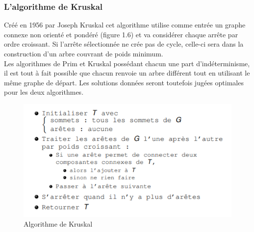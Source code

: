 \documentclass[memoire.tex]{subfiles}
\begin{document}
\subsubsection{L’algorithme de Kruskal}
Créé en 1956  par  Joseph Kruskal  cet algorithme utilise comme entrée un graphe connexe non orienté et pondéré (figure 1.6) et va considérer chaque arrête par ordre croissant. Si l’arrête sélectionnée ne crée pas de cycle, celle-ci sera dans la construction d’un arbre couvrant de poids minimum.\\
Les algorithmes de Prim et Kruskal possédant chacun une part d’indéterminisme, il est tout à fait possible que chacun renvoie un arbre différent tout en utilisant le même graphe de départ. Les solutions données seront toutefois jugées optimales pour les deux algorithmes.
	\begin{figure}[h!]
		\centerline{\includegraphics[scale=0.8]{img/kruskal.png}}
		\caption{Algorithme de Kruskal}
	\end{figure}
\newpage
\end{document}
